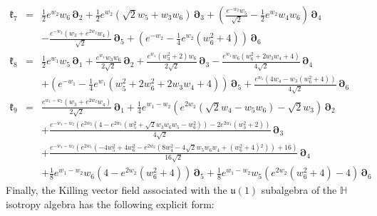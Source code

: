 \documentclass[10pt,a4paper]{article}
\newcommand{\uu}{\mathfrak{u}}
\begin{document}
\begin{eqnarray}
\label{Killvetsu2}
  \boldsymbol{\mathfrak{k}}_7 &=& \frac{1}{2} e^{w_2} w_6 \, \boldsymbol{\partial}_2+\frac{1}{2} e^{w_2} \left(\sqrt{2} w_5+w_3
   w_6\right) \, \boldsymbol{\partial}_3+\left(\frac{e^{-w_2} w_5}{\sqrt{2}}-\frac{1}{2} e^{w_2} w_4
   w_6\right) \, \boldsymbol{\partial}_4\nonumber\\
   &&-\frac{e^{-w_2} \left(w_3+e^{2 w_2} w_4\right)
   }{\sqrt{2}}\, \boldsymbol{\partial}_5+\left(e^{-w_2}-\frac{1}{4} e^{w_2}
   \left(w_6^2+4\right)\right) \, \boldsymbol{\partial}_6  \nonumber \\
  \boldsymbol{\mathfrak{k}}_8 &=& \frac{1}{2} e^{w_1} w_5 \, \boldsymbol{\partial}_1+\frac{e^{w_1} w_3 w_6 }{2
   \sqrt{2}}\, \boldsymbol{\partial}_2+\frac{e^{w_1} \left(w_3^2+2\right) w_6 }{2
   \sqrt{2}}\, \boldsymbol{\partial}_3-\frac{e^{w_1} w_6 \left(w_6^2+2 w_3 w_4+4\right) }{4
   \sqrt{2}}\, \boldsymbol{\partial}_4\nonumber \\
   &&+\left(e^{-w_1}-\frac{1}{4} e^{w_1} \left(w_5^2+2 w_6^2+2 w_3
   w_4+4\right)\right) \, \boldsymbol{\partial}_5+\frac{e^{w_1} \left(4 w_4-w_3
   \left(w_6^2+4\right)\right) }{4 \sqrt{2}}\, \boldsymbol{\partial}_6  \nonumber \\
  \boldsymbol{\mathfrak{k}}_9 &=& \frac{e^{w_1-w_2} \left(w_3+e^{2 w_2} w_4\right) }{2 \sqrt{2}}\, \boldsymbol{\partial}_1+\frac{1}{4}
   e^{w_1-w_2} \left(e^{2 w_2} \left(\sqrt{2} w_4-w_5 w_6\right)-\sqrt{2} w_3\right)
   \, \boldsymbol{\partial}_2\nonumber\\
   &&+\frac{e^{-w_1-w_2} \left(e^{2 w_2} \left(4-e^{2 w_1}
   \left(w_5^2+\sqrt{2} w_3 w_6 w_5-w_6^2\right)\right)-2 e^{2 w_1}
   \left(w_3^2+2\right)\right) }{4 \sqrt{2}}\, \boldsymbol{\partial}_3\nonumber\\
   &&+\frac{e^{-w_1-w_2} \left(e^{2
   w_1} \left(-4 w_5^2+4 w_6^2-e^{2 w_2} \left(8 w_4^2-4 \sqrt{2} w_5 w_6
   w_4+\left(w_6^2+4\right){}^2\right)\right)+16\right) }{16
   \sqrt{2}}\, \boldsymbol{\partial}_4 \nonumber\\
   &&+\frac{1}{8} e^{w_1-w_2} w_6 \left(4-e^{2 w_2} \left(w_6^2+4\right)\right)
   \, \boldsymbol{\partial}_5+\frac{1}{8} e^{w_1-w_2} w_5 \left(e^{2 w_2}
   \left(w_6^2+4\right)-4\right) \, \boldsymbol{\partial}_6
\end{eqnarray}
Finally, the Killing vector field associated with the  $\uu(1)$ subalgebra of the $\mathbb{H}$ isotropy algebra
has the following explicit form:
\end{document}
